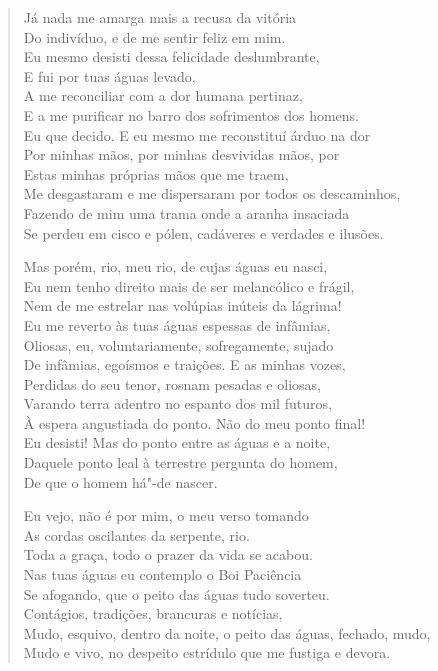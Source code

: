 {\begin{verse}
Já nada me amarga mais a recusa da vitória\\
Do indivíduo, e de me sentir feliz em mim.\\
Eu mesmo desisti dessa felicidade deslumbrante,\\
E fui por tuas águas levado,\\
A me reconciliar com a dor humana pertinaz,\\
E a me purificar no barro dos sofrimentos dos homens.\\
Eu que decido. E eu mesmo me reconstituí árduo na dor\\
Por minhas mãos, por minhas desvividas mãos, por\\
Estas minhas próprias mãos que me traem,\\
Me desgastaram e me dispersaram por todos os descaminhos,\\
Fazendo de mim uma trama onde a aranha insaciada\\
Se perdeu em cisco e pólen, cadáveres e verdades e ilusões.

Mas porém, rio, meu rio, de cujas águas eu nasci,\\
Eu nem tenho direito mais de ser melancólico e frágil,\\
Nem de me estrelar nas volúpias inúteis da lágrima!\\
Eu me reverto às tuas águas espessas de infâmias,\\
Oliosas, eu, voluntariamente, sofregamente, sujado\\
De infâmias, egoísmos e traições. E as minhas vozes,\\
Perdidas do seu tenor, rosnam pesadas e oliosas,\\
Varando terra adentro no espanto dos mil futuros,\\
À espera angustiada do ponto. Não do meu ponto final!\\
Eu desisti! Mas do ponto entre as águas e a noite,\\
Daquele ponto leal à terrestre pergunta do homem,\\
De que o homem há"-de nascer.

Eu vejo, não é por mim, o meu verso tomando\\
As cordas oscilantes da serpente, rio.\\
Toda a graça, todo o prazer da vida se acabou.\\
Nas tuas águas eu contemplo o Boi Paciência\\
Se afogando, que o peito das águas tudo soverteu.\\
Contágios, tradições, brancuras e notícias,\\
Mudo, esquivo, dentro da noite, o peito das águas, fechado, mudo,\\
Mudo e vivo, no despeito estrídulo que me fustiga e devora.


\end{verse}}
